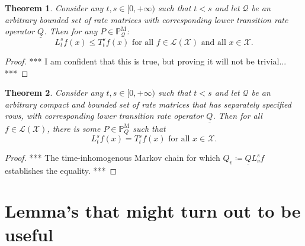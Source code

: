\documentclass[a4paper,reqno]{amsart}
\newtheorem{theorem}{Theorem}
\newcommand{\states}{\mathcal{X}}
\newcommand{\processes}{\mathbb{P}}
\newcommand{\mprocesses}{\processes^{\mathrm{M}}}
\newcommand{\lbound}{L}
\newcommand{\gambles}{\mathcal{L}}
\newcommand{\gamblesX}{\gambles(\states)}
\newcommand{\rateset}{\mathcal{Q}}
\newcommand{\lrate}{\underline{Q}}
\begin{document}
\begin{theorem}
Consider any $t,s\in[0,+\infty)$ such that $t<s$ and let $\rateset$ be an arbitrary bounded set of rate matrices with corresponding lower transition rate operator $\lrate$. Then for any $P\in\mprocesses_\rateset$:
\begin{equation*}
\lbound_t^sf(x)\leq T_t^sf(x)
\text{ for all $f\in\gamblesX$ and all $x\in\states$.}
\end{equation*}
\end{theorem}
\begin{proof}
*** I am confident that this is true, but proving it will not be trivial... ***
\end{proof}

\begin{theorem}
Consider any $t,s\in[0,+\infty)$ such that $t<s$ and let $\rateset$ be an arbitrary compact and bounded set of rate matrices that has separately specified rows, with corresponding lower transition rate operator $\lrate$. Then for all $f\in\gamblesX$, there is some $P\in\mprocesses_Q$ such that
\begin{equation*}
\lbound_t^sf(x)=T_t^sf(x)
\text{ for all $x\in\states$.}
\end{equation*}
\end{theorem}
\begin{proof}
*** The time-inhomogenous Markov chain for which $Q_v\coloneqq\lrate\lbound_v^sf$ establishes the equality. ***
\end{proof}

\section{Lemma's that might turn out to be useful}
\end{document}
